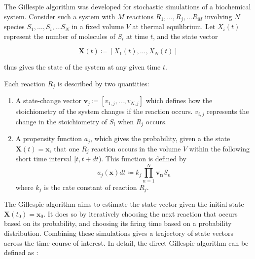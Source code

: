 The Gillespie algorithm was developed for stochastic simulations of a biochemical system.
Consider such a system with $M$ reactions $R_{1}, \ldots , R_{j}, \ldots R_{M}$ involving $N$ species $S_{1}, \ldots , S_{i}, \ldots S_{N}$ in a fixed volume $V$ at thermal equilibrium.
Let $X_{i}(t)$ represent the number of molecules of $S_{i}$ at time $t$, and the state vector

\begin{equation}
  \mathbf{X}(t) \coloneqq [X_{1}(t), \ldots , X_{N}(t)]
  \label{eq:gillespie-statevector}
\end{equation}

thus gives the state of the system at any given time $t$.

Each reaction $R_{j}$ is described by two quantities:
\begin{enumerate}
  \item A state-change vector $\mathbf{v}_{j} \coloneqq [v_{1,j}, \ldots , v_{N,j}]$ which defines how the stoichiometry of the system changes if the reaction occurs.
        $v_{i,j}$ represents the change in the stoichiometry of $S_{i}$ when $R_{j}$ occurs.
  \item A propensity function $a_{j}$, which gives the probability, given a the state $\mathbf{X}(t) = \mathbf{x}$, that one $R_{j}$ reaction occurs in the volume $V$ within the following short time interval $[t, t+dt)$.
        This function is defined by
        \begin{equation}
          a_{j}(\mathbf{x})dt \coloneqq k_{j} \prod_{n=1}^{N}\mathbf{v_{n}}S_{n}
          \label{eq:gillespie-propensity}
        \end{equation}
        where $k_{j}$ is the rate constant of reaction $R_{j}$.
\end{enumerate}

The Gillespie algorithm aims to estimate the state vector given the initial state $\mathbf{X}(t_{0}) = \mathbf{x}_{0}$.
It does so by iteratively choosing the next reaction that occurs based on its probability, and choosing its firing time based on a probability distribution.
Combining these simulations gives a trajectory of state vectors across the time course of interest.
In detail, the direct Gillespie algorithm can be defined as \parencite{gillespieStochasticSimulationChemical2007}:

